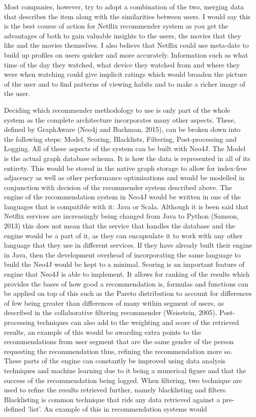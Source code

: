 \documentclass[a4paper]{article}
\begin{document}
Most companies, however, try to adopt a combination of the two, merging data that describes the item along with the similarities between users. I would say this is the best course of action for Netflix recommender system as you get the advantages of both to gain valuable insights to the users, the movies that they like and the movies themselves. I also believe that Netflix could use meta-date to build up profiles on users quicker and more accurately. Information such as what time of the day they watched, what device they watched from and where they were when watching could give implicit ratings which would broaden the picture of the user and to find patterns of viewing habits and to make a richer image of the user. \par

Deciding which recommender methodology to use is only part of the whole system as the complete architecture incorporates many other aspects. These, defined by GraphAware (Neo4j and Bachman, 2015), can be broken down into the following steps: Model, Scoring, Blacklists, Filtering, Post-processing and Logging. All of these aspects of the system can be built with Neo4J. The Model is the actual graph database schema. It is how the data is represented in all of its entirety. This would be stored in the native graph storage to allow for index-free adjacency as well as other performance optimisations and would be modelled in conjunction with decision of the recommender system described above. The engine of the recommendation system in Neo4J would be written in one of the languages that is compatible with it: Java or Scala. Although it is been said that Netflix services are increasingly being changed from Java to Python (Samson, 2013) this does not mean that the service that handles the database and the engine would be a part of it, as they can encapsulate it to work with any other language that they use in different services. If they have already built their engine in Java, then the development overhead of incorporating the same language to build the Neo4J would be kept to a minimal. Scoring is an important feature of engine that Neo4J is able to implement. It allows for ranking of the results which provides the bases of how good a recommendation is, formulas and functions can be applied on top of this such as the Pareto distribution to account for differences of few being greater than differences of many within segment of users, as described in the collaborative filtering recommender (Weisstein, 2005). Post-processing techniques can also add to the weighting and score of the retrieved results, an example of this would be awarding extra points to the recommendations from user segment that are the same gender of the person requesting the recommendation thus, refining the recommendation more so. These parts of the engine can constantly be improved using data analysis techniques and machine learning due to it being a numerical figure and that the success of the recommendation being logged. When filtering, two technique are used to refine the results retrieved further, namely blacklisting and filters. Blacklisting is common technique that rids any data retrieved against a pre-defined 'list'. An example of this in recommendation systems would 
\end{document}

